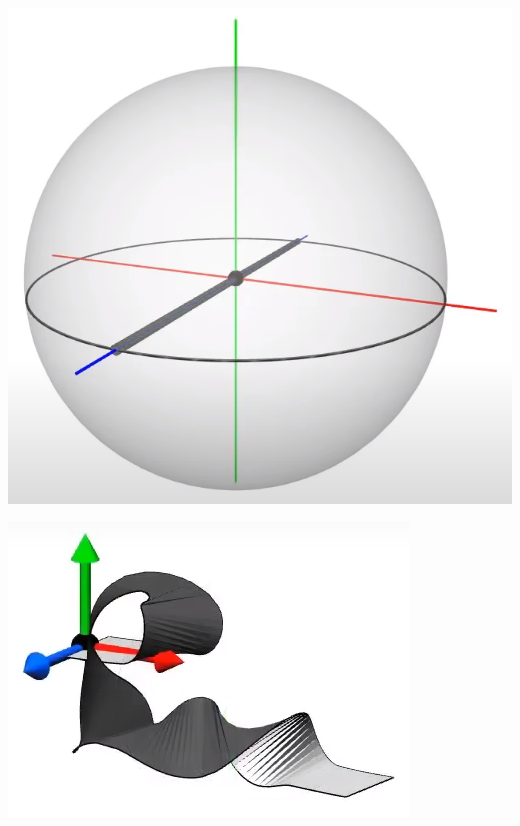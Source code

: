 \documentclass[10pt]{beamer}
\begin{document}
    \includegraphics[scale=0.1]{Pictures/zaxissphere.png}

    \includegraphics[scale=0.1]{Pictures/randomrotbelt.png}
\end{document}
